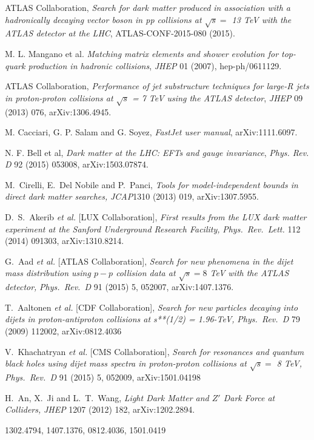 ATLAS Collaboration, \emph{Search for dark matter produced in association with a hadronically decaying vector boson in pp collisions at $\sqrt{s}=$ 13 TeV with the ATLAS detector at the LHC}, ATLAS-CONF-2015-080 (2015).

M. L. Mangano et al. \emph{Matching matrix elements and shower evolution for top-quark production in hadronic collisions}, \emph{JHEP} 01 (2007), hep-ph/0611129.

ATLAS Collaboration, \emph{Performance of jet substructure techniques for large-R jets in proton-proton collisions at $\sqrt{s}$ = 7 TeV using the ATLAS detector}, \emph{JHEP} 09 (2013) 076, arXiv:1306.4945.

M. Cacciari, G. P. Salam and G. Soyez, \emph{FastJet user manual}, arXiv:1111.6097.

N. F. Bell et al, \emph{Dark matter at the LHC: EFTs and gauge invariance}, \emph{Phys. Rev. D} 92 (2015) 053008, arXiv:1503.07874.

  
  M.~Cirelli, E.~Del Nobile and P.~Panci,
  \emph{Tools for model-independent bounds in direct dark matter searches,}
  \emph{JCAP}1310 (2013) 019, arXiv:1307.5955.
  
  D.~S.~Akerib {\it et al.} [LUX Collaboration], \emph{First results from the LUX dark matter experiment at the Sanford Underground Research Facility,}
  \emph{Phys.\ Rev.\ Lett.} 112 (2014) 091303, arXiv:1310.8214.

  G.~Aad {\it et al.} [ATLAS Collaboration],
 \emph{Search for new phenomena in the dijet mass distribution using $p-p$ collision data at $\sqrt{s}=8$ TeV with the ATLAS detector,}
  \emph{Phys.\ Rev.\ D} 91 (2015) 5,  052007, arXiv:1407.1376.
   
  T.~Aaltonen {\it et al.} [CDF Collaboration],
  \emph{Search for new particles decaying into dijets in proton-antiproton collisions at s**(1/2) = 1.96-TeV,}
  \emph{Phys.\ Rev.\ D}  79 (2009) 112002,
  arXiv:0812.4036
  
  V.~Khachatryan {\it et al.} [CMS Collaboration],
  \emph{Search for resonances and quantum black holes using dijet mass spectra in proton-proton collisions at $\sqrt{s} =$ 8 TeV,}
  \emph{Phys.\ Rev.\ D}   91 (2015) 5,  052009,
  arXiv:1501.04198
  
  H.~An, X.~Ji and L.~T.~Wang,
   \emph{Light Dark Matter and $Z'$ Dark Force at Colliders,}
    \emph{JHEP} 1207 (2012) 182, arXiv:1202.2894.

1302.4794, 1407.1376, 0812.4036, 1501.0419






